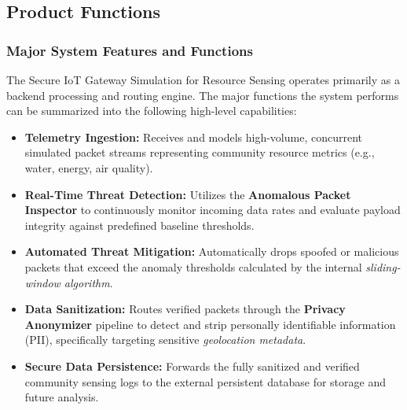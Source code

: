 \documentclass[12pt,letterpaper]{article}
\begin{document}
\subsection{Product Functions}
\subsubsection{Major System Features and Functions}
The Secure IoT Gateway Simulation for Resource Sensing operates primarily as a backend processing and routing engine. The major functions the system performs can be summarized into the following high-level capabilities:\par
\begin{itemize}
\item \textbf{Telemetry Ingestion:} Receives and models high-volume, concurrent simulated packet streams representing community resource metrics (e.g., water, energy, air quality).
\item \textbf{Real-Time Threat Detection:} Utilizes the \textbf{Anomalous Packet Inspector} to continuously monitor incoming data rates and evaluate payload integrity against predefined baseline thresholds.
\item \textbf{Automated Threat Mitigation:} Automatically drops spoofed or malicious packets that exceed the anomaly thresholds calculated by the internal \emph{sliding-window algorithm}.
\item \textbf{Data Sanitization:} Routes verified packets through the \textbf{Privacy Anonymizer} pipeline to detect and strip personally identifiable information (PII), specifically targeting sensitive \emph{geolocation metadata}.
\item \textbf{Secure Data Persistence:} Forwards the fully sanitized and verified community sensing logs to the external persistent database for storage and future analysis.
\end{itemize}
\end{document}
